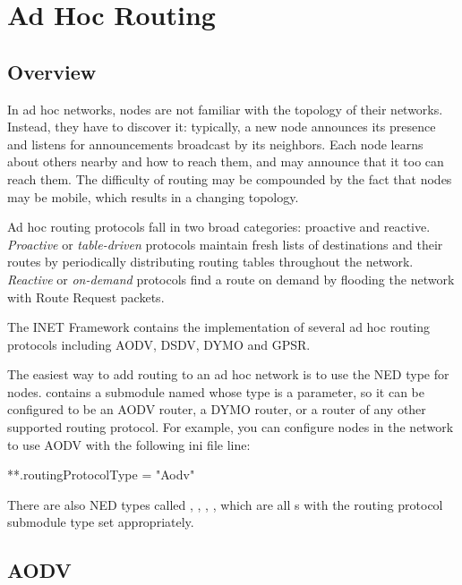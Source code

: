 \chapter{Ad Hoc Routing}
\label{cha:adhoc-routing}

\section{Overview}
\label{sec:adhocrouting:overview}

In ad hoc networks, nodes are not familiar with the topology of
their networks. Instead, they have to discover it: typically,
a new node announces its presence and listens for announcements
broadcast by its neighbors. Each node learns about others nearby
and how to reach them, and may announce that it too can reach them.
The difficulty of routing may be compounded by the fact that
nodes may be mobile, which results in a changing topology.

Ad hoc routing protocols fall in two broad categories: proactive
and reactive. \textit{Proactive} or \textit{table-driven} protocols
maintain fresh lists of destinations and their routes by periodically
distributing routing tables throughout the network.
\textit{Reactive} or \textit{on-demand} protocols find a route on demand
by flooding the network with Route Request packets.

The INET Framework contains the implementation of several ad hoc routing
protocols including AODV, DSDV, DYMO and GPSR.

The easiest way to add routing to an ad hoc network is to use the
 NED type for nodes. 
contains a submodule named  whose type is a parameter,
so it can be configured to be an AODV router, a DYMO router, or a
router of any other supported routing protocol. For example, you
can configure  nodes in the network to use
AODV with the following ini file line:

\begin{inifile}
**.routingProtocolType = "Aodv"
\end{inifile}

There are also NED types called , ,
, , which are all
s with the routing protocol submodule type
set appropriately.


\section{AODV}
\label{sec:adhocrouting:aodv}

